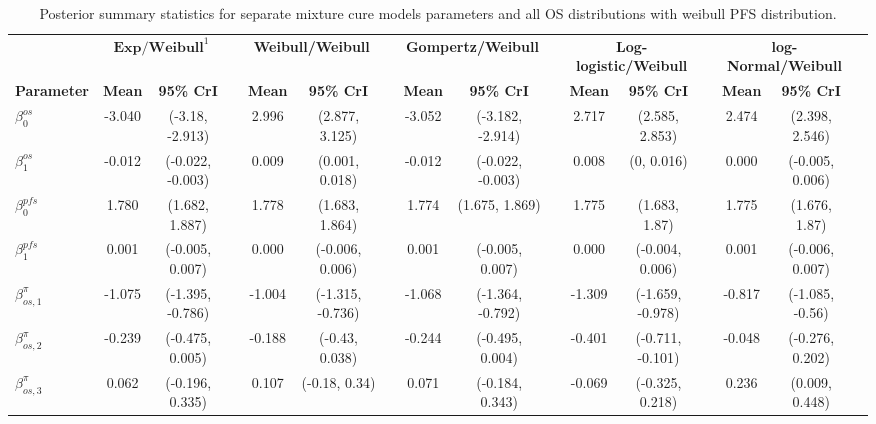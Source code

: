 \documentclass[AMA,STIX1COL]{WileyNJD-v2}
\begin{document}
\begin{landscape}
\begin{center}
\begin{table}[t]
\caption{Posterior summary statistics for separate mixture cure models parameters and all OS distributions with weibull PFS distribution. \label{tab:post_sep_pfs_weibull}}
\centering
\begin{tabular}{l c c c c c c c c c c c c c c c}
\toprule
\multicolumn{1}{l}{} & \multicolumn{2}{c}{$\textbf{Exp/Weibull}^1$} & & \multicolumn{2}{c}{\textbf{Weibull/Weibull}} & & \multicolumn{2}{c}{\textbf{Gompertz/Weibull}} & & \multicolumn{2}{c}{\textbf{Log-logistic/Weibull}} & & \multicolumn{2}{c}{\textbf{log-Normal/Weibull}}\\
\cmidrule{2-3}\cmidrule{5-6}\cmidrule{8-9}\cmidrule{11-12}\cmidrule{14-15}
\textbf{Parameter} & \textbf{Mean} & \textbf{95\% CrI} & & \textbf{Mean} & \textbf{95\% CrI} & & \textbf{Mean} & \textbf{95\% CrI} & & \textbf{Mean} & \textbf{95\% CrI} & & \textbf{Mean} & \textbf{95\% CrI}\\
\midrule
$\beta^{os}_0$ & -3.040 & (-3.18, -2.913) &  & 2.996 & (2.877, 3.125) &  & -3.052 & (-3.182, -2.914) &  & 2.717 & (2.585, 2.853) &  & 2.474 & (2.398, 2.546) & \\
$\beta^{os}_1$ & -0.012 & (-0.022, -0.003) &  & 0.009 & (0.001, 0.018) &  & -0.012 & (-0.022, -0.003) &  & 0.008 & (0, 0.016) &  & 0.000 & (-0.005, 0.006) & \\
$\beta^{pfs}_0$ & 1.780 & (1.682, 1.887) &  & 1.778 & (1.683, 1.864) &  & 1.774 & (1.675, 1.869) &  & 1.775 & (1.683, 1.87) &  & 1.775 & (1.676, 1.87) & \\
$\beta^{pfs}_1$ & 0.001 & (-0.005, 0.007) &  & 0.000 & (-0.006, 0.006) &  & 0.001 & (-0.005, 0.007) &  & 0.000 & (-0.004, 0.006) &  & 0.001 & (-0.006, 0.007) & \\
$\beta^{\pi}_{os, 1}$ & -1.075 & (-1.395, -0.786) &  & -1.004 & (-1.315, -0.736) &  & -1.068 & (-1.364, -0.792) &  & -1.309 & (-1.659, -0.978) &  & -0.817 & (-1.085, -0.56) & \\
$\beta^{\pi}_{os, 2}$ & -0.239 & (-0.475, 0.005) &  & -0.188 & (-0.43, 0.038) &  & -0.244 & (-0.495, 0.004) &  & -0.401 & (-0.711, -0.101) &  & -0.048 & (-0.276, 0.202) & \\
$\beta^{\pi}_{os, 3}$ & 0.062 & (-0.196, 0.335) &  & 0.107 & (-0.18, 0.34) &  & 0.071 & (-0.184, 0.343) &  & -0.069 & (-0.325, 0.218) &  & 0.236 & (0.009, 0.448) & \\

\end{tabular}
\end{table}
\end{center}
\end{landscape}
\end{document}
